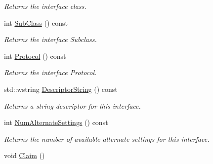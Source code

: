\begin{DoxyCompactItemize}
\begin{DoxyCompactList}\small\item\em Returns the interface class. \end{DoxyCompactList}\item 
\hypertarget{class_lib_u_s_b_1_1_interface_ab5fcfdab1f342dc7096c3f8b0d7ebd9b}{int \hyperlink{class_lib_u_s_b_1_1_interface_ab5fcfdab1f342dc7096c3f8b0d7ebd9b}{Sub\-Class} () const }\label{class_lib_u_s_b_1_1_interface_ab5fcfdab1f342dc7096c3f8b0d7ebd9b}

\begin{DoxyCompactList}\small\item\em Returns the interface Subclass. \end{DoxyCompactList}\item 
\hypertarget{class_lib_u_s_b_1_1_interface_a67ded20edf389d021702a4face74d70d}{int \hyperlink{class_lib_u_s_b_1_1_interface_a67ded20edf389d021702a4face74d70d}{Protocol} () const }\label{class_lib_u_s_b_1_1_interface_a67ded20edf389d021702a4face74d70d}

\begin{DoxyCompactList}\small\item\em Returns the interface Protocol. \end{DoxyCompactList}\item 
\hypertarget{class_lib_u_s_b_1_1_interface_a7e5da83b8c77cd2ec43da8e2917d2383}{std\-::wstring \hyperlink{class_lib_u_s_b_1_1_interface_a7e5da83b8c77cd2ec43da8e2917d2383}{Descriptor\-String} () const }\label{class_lib_u_s_b_1_1_interface_a7e5da83b8c77cd2ec43da8e2917d2383}

\begin{DoxyCompactList}\small\item\em Returns a string descriptor for this interface. \end{DoxyCompactList}\item 
\hypertarget{class_lib_u_s_b_1_1_interface_a6bb6c4d5cea3a7d6e6e927afd36a30c1}{int \hyperlink{class_lib_u_s_b_1_1_interface_a6bb6c4d5cea3a7d6e6e927afd36a30c1}{Num\-Alternate\-Settings} () const }\label{class_lib_u_s_b_1_1_interface_a6bb6c4d5cea3a7d6e6e927afd36a30c1}

\begin{DoxyCompactList}\small\item\em Returns the number of available alternate settings for this interface. \end{DoxyCompactList}\item 
\hypertarget{class_lib_u_s_b_1_1_interface_a38e98dcd6c3d9878f0070ddb207de1db}{void \hyperlink{class_lib_u_s_b_1_1_interface_a38e98dcd6c3d9878f0070ddb207de1db}{Claim} ()}\label{class_lib_u_s_b_1_1_interface_a38e98dcd6c3d9878f0070ddb207de1db}


\end{DoxyCompactItemize}
